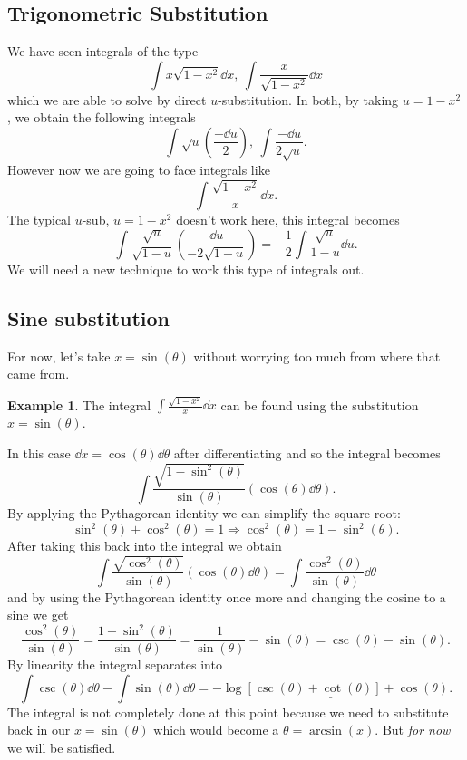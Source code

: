 \documentclass[12pt]{article}
\theoremstyle{plain}
\theoremstyle{definition}
\newtheorem{Ex}[Th]{Example}           %
\theoremstyle{remark}
\newcommand{\te}{\theta}                %
\renewcommand{\:}{\colon}           %
\newcommand{\un}[1]{\underline{#1}}
\renewcommand{\.}{\Cdot}                %
\newcommand{\To}{\Rightarrow}
\begin{document}
\begin{multicols}{2}
\section*{Trigonometric Substitution}
We have seen integrals of the type
$$
\int x\sqrt{1-x^2}\dd x,\ \int\frac{x}{\sqrt{1-x^2}}\dd x
$$
which we are able to solve by direct $u$-substitution. In both, by taking $u=1-x^2$, we obtain the following integrals
$$
\int \sqrt{u}\left(\frac{-\dd u}{2}\right),\ \int\frac{-\dd u}{2\sqrt{u}}.
$$
However now we are going to face integrals like 
$$\int\frac{\sqrt{1-x^2}}{x}\dd x.$$
The typical $u$-sub, $u=1-x^2$ doesn't work here, this integral becomes 
$$\int\frac{\sqrt{u}}{\sqrt{1-u}}\left(\frac{\dd u}{-2\sqrt{1-u}}\right)=-\frac{1}{2}\int\frac{\sqrt{u}}{1-u}\dd u.$$
We will need a new technique to work this type of integrals out.
\subsection*{Sine substitution}
For now, let's take $x=\sin(\te)$ without worrying too much from where that came from.

\begin{Ex} 
The integral $\int\frac{\sqrt{1-x^2}}{x}\dd x$ can be found using the substitution $x=\sin(\te)$.\par 
In this case $\dd x=\cos(\te)\dd\te$ after differentiating and so the integral becomes 
$$\int\frac{\sqrt{1-\sin^2(\te)}}{\sin(\te)}(\cos(\te)\dd\te).$$
By applying the Pythagorean identity we can simplify the square root:
$$\sin^2(\te)+\cos^2(\te)=1\To\cos^2(\te)=1-\sin^2(\te).$$
After taking this back into the integral we obtain
$$\int\frac{\sqrt{\cos^2(\te)}}{\sin(\te)}(\cos(\te)\dd\te)=\int \frac{\cos^2(\te)}{\sin(\te)}\dd\te$$
and by using the Pythagorean identity once more and changing the cosine to a sine we get 
$$\frac{\cos^2(\te)}{\sin(\te)}=\frac{1-\sin^2(\te)}{\sin(\te)}=\frac{1}{\sin(\te)}-\sin(\te)=\csc(\te)-\sin(\te).$$
By linearity the integral separates into 
$$\int\csc(\te)\dd\te-\int\sin(\te)\dd\te=\un{-\log[\csc(\te)+\cot(\te)]+\cos(\te)}.$$
The integral is not completely done at this point because we need to substitute back in our $x=\sin(\te)$ which would become a $\te=\arcsin(x)$. But \emph{for now} we will be satisfied.
\end{Ex}


\end{multicols}
\end{document}
